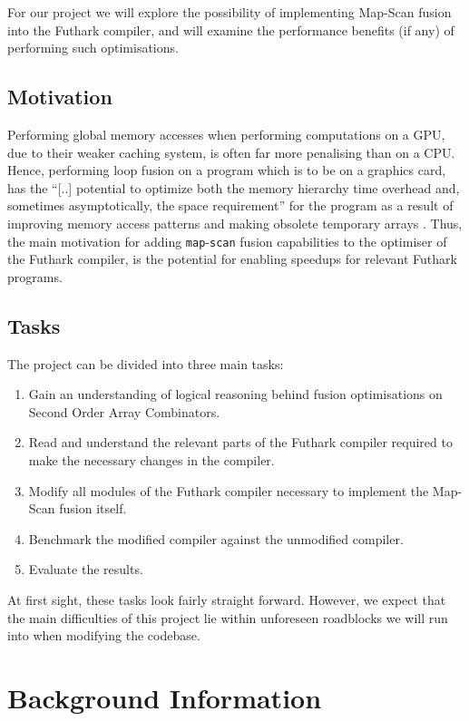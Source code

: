 \documentclass[11pt]{article}
\begin{document}
For our project we will explore the possibility of implementing Map-Scan fusion into the Futhark compiler, and will examine the performance benefits (if any) of performing such optimisations.

\subsection{Motivation}
Performing global memory accesses when performing computations on a GPU, due to their weaker caching system, is often far more penalising than on a CPU. Hence, performing loop fusion on a program
 which is to be on a graphics card, has the ``[..] potential to optimize both the memory hierarchy time overhead and, sometimes asymptotically, the space requirement'' for the program as a result of 
improving memory access patterns and making obsolete temporary arrays \cite{T2Fusion}. Thus, the main motivation for adding \texttt{map}-\texttt{scan} fusion capabilities to
 the optimiser of the Futhark compiler, is the potential for enabling speedups for relevant Futhark programs.

\subsection{Tasks}
The project can be divided into three main tasks:
\begin{enumerate}
    \item Gain an understanding of logical reasoning behind fusion optimisations on Second Order Array Combinators.
    \item Read and understand the relevant parts of the Futhark compiler required to make the necessary changes in the compiler.
    \item Modify all modules of the Futhark compiler necessary to implement the Map-Scan fusion itself.
    \item Benchmark the modified compiler against the unmodified compiler.
    \item Evaluate the results.
\end{enumerate}
At first sight, these tasks look fairly straight forward. However, we expect that the main difficulties of this project lie within unforeseen roadblocks we will run into when modifying the codebase.

\section{Background Information}
\end{document}
